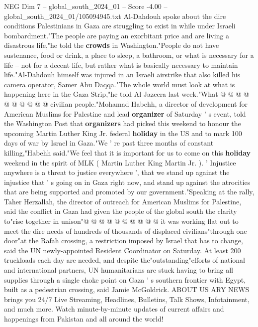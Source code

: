 \begin{textsample}{NEG Dim 7 – global\_south\_2024\_01 – Score -4.00 – global\_south\_2024\_01/105094945.txt}
Al-Dahdouh spoke about the dire conditions Palestinians in Gaza are struggling to exist in while under Israeli bombardment."The people are paying an exorbitant price and are living a disastrous life,"he told the \textbf{crowds} in Washington."People do not have sustenance, food or drink, a place to sleep, a bathroom, or what is necessary for a life -- not for a decent life, but rather what is basically necessary to maintain life."Al-Dahdouh himself was injured in an Israeli airstrike that also killed his camera operator, Samer Abu Daqqa."The whole world must look at what is happening here in the Gaza Strip,"he told Al Jazeera last week."What @ @ @ @ @ @ @ @ @ @ civilian people."Mohamad Habehh, a director of development for American Muslims for Palestine and lead \textbf{organizer} of Saturday ' s event, told the Washington Post that \textbf{organizers} had picked this weekend to honour the upcoming Martin Luther King Jr. federal \textbf{holiday} in the US and to mark 100 days of war by Israel in Gaza."We ' re past three months of constant killing,"Habehh said."We feel that it is important for us to come on this \textbf{holiday} weekend in the spirit of MLK ( Martin Luther King Martin Jr. ). ' Injustice anywhere is a threat to justice everywhere ', that we stand up against the injustice that ' s going on in Gaza right now, and stand up against the atrocities that are being supported and promoted by our government."Speaking at the rally, Taher Herzallah, the director of outreach for American Muslims for Palestine, said the conflict in Gaza had given the people of the global south the clarity to"rise together in unison"@ @ @ @ @ @ @ @ @ @ it was working flat out to meet the dire needs of hundreds of thousands of displaced civilians"through one door"at the Rafah crossing, a restriction imposed by Israel that has to change, said the UN newly-appointed Resident Coordinator on Saturday.
At least 200 truckloads each day are needed, and despite the"outstanding"efforts of national and international partners, UN humanitarians are stuck having to bring all supplies through a single choke point on Gaza ' s southern frontier with Egypt, built as a pedestrian crossing, said Jamie McGoldrick.
ABOUT US ARY NEWS brings you 24/7 Live Streaming, Headlines, Bulletins, Talk Shows, Infotainment, and much more.
Watch minute-by-minute updates of current affairs and happenings from Pakistan and all around the world!

\end{textsample}
